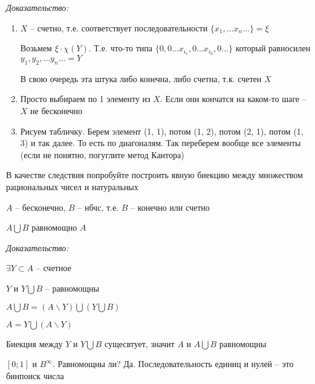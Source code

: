 \documentclass[12pt]{article}
\begin{document}
\textit{Доказательство:}

\begin{enumerate}
    \item $X$ -- счетно, т.е. соответствует последовательности $\{x_1, \ldots x_n \ldots\} = \xi$
    
    Возьмем $\xi \cdot \chi(Y)$. Т.е. что-то типа $\{ 0, 0 \ldots x_{i_1}, 0 \ldots x_{i_2}, 0 \ldots \}$ который равносилен $y_1, y_2, \ldots y_n \ldots = Y$

    В свою очередь эта штука либо конечна, либо счетна, т.к. счетен $X$

    \item Просто выбираем по 1 элементу из $X$. Если они кончатся на каком-то шаге -- $X$ не бесконечно
    
    \item Рисуем табличку. Берем элемент (1, 1), потом (1, 2), потом (2, 1), потом (1, 3) и так далее. То есть по диагоналям. Так переберем вообще все элементы (если не понятно, погуглите метод Кантора)
\end{enumerate}

\begin{Exercise}{}
    В качестве следствия попробуйте построить явную биекцию между множеством рациональных чисел и натуральных
\end{Exercise}

\begin{theo}{}
    $A$ -- бесконечно, $B$ -- нбчс, т.е. $B$ -- конечно или счетно

    $A \bigcup B$ равномощно $A$
\end{theo}

\textit{Доказательство:}

$\exists Y \subset A$ -- счетное

$Y$ и $Y \bigcup B$ -- равномощны

$A \bigcup B = (A \backslash Y) \bigcup (Y \bigcup B)$

$A = Y \bigcup (A \backslash Y)$

Биекция между $Y$ и $Y \bigcup B$ сущесвтует, значит $A$ и $A \bigcup B$ равномощны

\begin{Example}{}
    $[0; 1]$ и $B^\infty$. Равномощны ли? Да. Последовательность единиц и нулей -- это бинпоиск числа
\end{Example}
\end{document}
